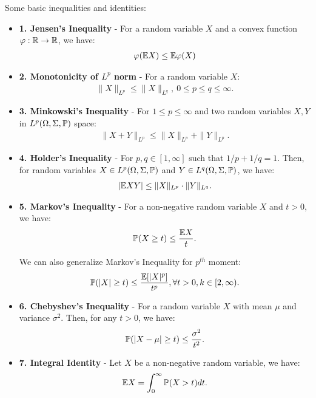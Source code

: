\noindent Some basic inequalities and identities:
\begin{itemize}
    \item \textbf{1. Jensen's Inequality} - For a random variable $X$ and a convex function $\varphi:\mathbb{R}\to\mathbb{R}$, we have:
    \begin{align}
        \varphi(\mathbb{E} X) \le \mathbb{E}\varphi(X)
    \end{align}

    \item \textbf{2. Monotonicity of $L^p$ norm} - For a random variable $X$:
    \begin{align}
        \|X\|_{L^p} \le \|X\|_{L^q}, \ 0 \le p\le q \le \infty.
    \end{align}

    \item \textbf{3. Minkowski's Inequality} - For $1\le p \le \infty$ and two random variables $X, Y$ in $L^p(\Omega, \Sigma, \mathbb{P})$ space:
    \begin{align}
        \|X+Y\|_{L^p} \le \|X\|_{L^p} + \|Y\|_{L^p}.
    \end{align}

    \item \textbf{4. Holder's Inequality} - For $p, q\in [1, \infty]$ such that $1/p + 1/q=1$. Then, for random variables $X\in L^p(\Omega, \Sigma, \mathbb{P})$ and $Y\in L^q(\Omega, \Sigma, \mathbb{P})$, we have:
    \begin{align}
        |\mathbb{E} XY| \le \|X\|_{L^p}\cdot\|Y\|_{L^q}.
    \end{align}
    
    \item \textbf{5. Markov's Inequality} - For a non-negative random variable $X$ and $t>0$, we have:
    \begin{align}
        \mathbb{P}(X \ge t ) \le \frac{\mathbb{E} X}{t}.
    \end{align}

    \noindent We can also generalize Markov's Inequality for $p^{th}$ moment:
    \begin{align}
        \mathbb{P}(|X| \ge t) \le \frac{\mathbb{E}[|X|^p]}{t^p}, \forall t > 0, k \in [2, \infty).
    \end{align}

    \item \textbf{6. Chebyshev's Inequality} - For a random variable $X$ with mean $\mu$ and variance $\sigma^2$. Then, for any $t>0$, we have:
    \begin{align}
        \mathbb{P}(|X-\mu| \ge t) \le \frac{\sigma^2}{t^2}.
    \end{align}

    \item \textbf{7. Integral Identity} - Let $X$ be a non-negative random variable, we have:
    \begin{align}
        \mathbb{E} X = \int_0^\infty \mathbb{P}(X > t)dt.
    \end{align}
\end{itemize}

